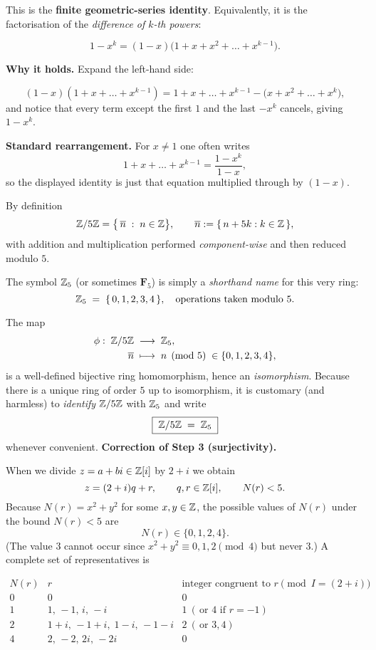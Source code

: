 \documentclass[12pt]{article}
\theoremstyle{definition} %
\theoremstyle{plain} %
\begin{document}
This is the \textbf{finite geometric-series identity}.  
Equivalently, it is the factorisation of the \emph{difference of $k$-th powers}:

\[
1-x^{k}=(1-x)\bigl(1+x+x^{2}+\dots+x^{k-1}\bigr).
\]

\bigskip
\textbf{Why it holds.}  Expand the left-hand side:

\[
(1-x)(1+x+\dots+x^{k-1})
=1+x+\dots+x^{k-1}-\bigl(x+x^{2}+\dots+x^{k}\bigr),
\]
and notice that every term except the first \(1\) and the last \(-x^{k}\)
cancels, giving \(1-x^{k}\).

\bigskip
\textbf{Standard rearrangement.}  For \(x\neq1\) one often writes
\[
1+x+\dots+x^{k-1}
=\frac{1-x^{k}}{1-x},
\]
so the displayed identity is just that equation multiplied through by
\((1-x)\).

By definition
\[
\Bbb Z/5\Bbb Z
=\bigl\{\,\overline{n}\;:\;n\in\Bbb Z\bigr\},
\qquad
\overline{n}:=\{\,n+5k : k\in\Bbb Z\,\},
\]
with addition and multiplication performed
\emph{component-wise} and then reduced modulo \(5\).

The symbol \(\Bbb Z_{5}\) (or sometimes \(\mathbf{F}_{5}\))
is simply a \emph{shorthand name} for this very ring:
\[
\Bbb Z_{5}
\;=\;
\{\,0,1,2,3,4\,\},
\quad
\text{operations taken modulo }5.
\]

The map
\[
\begin{aligned}
\phi:\;\Bbb Z/5\Bbb Z &\;\longrightarrow\; \Bbb Z_{5},\\
\overline{n}&\;\longmapsto\;n\pmod{5}\;\in\{0,1,2,3,4\},
\end{aligned}
\]
is a well-defined bijective ring homomorphism, hence an \emph{isomorphism}.
Because there is a unique ring of order \(5\) up to isomorphism,
it is customary (and harmless) to \emph{identify}
\(\Bbb Z/5\Bbb Z\) with \(\Bbb Z_{5}\) and write
\[
\boxed{\;\Bbb Z/5\Bbb Z\;=\;\Bbb Z_{5}\;}
\]
whenever convenient.
\bigskip
\textbf{Correction of Step 3 (surjectivity).}

When we divide $z=a+bi\in\Bbb Z[i]$ by $2+i$ we obtain
\[
z=(2+i)q+r, \qquad q,r\in\Bbb Z[i],\qquad N(r)<5.
\]
Because $N(r)=x^{2}+y^{2}$ for some $x,y\in\Bbb Z$, the
possible values of $N(r)$ under the bound $N(r)<5$ are
\[
N(r)\in\{0,1,2,4\}.
\]
(The value $3$ cannot occur since $x^{2}+y^{2}\equiv0,1,2\pmod4$ but
never $3$.)  A complete set of representatives is

\[
\begin{array}{c|c|c}
N(r) & r & \text{integer congruent to }r\pmod{I=(2+i)}\\\hline
0 & 0                     & 0\\
1 & 1,\,-1,\,i,\,-i       & 1\ (\,\text{or }4\text{ if }r=-1)\\
2 & 1+i,\,-1+i,\;1-i,\,-1-i & 2\ (\,\text{or }3,4)\\
4 & 2,\,-2,\,2i,\,-2i     & 0
\end{array}
\]
\end{document}
